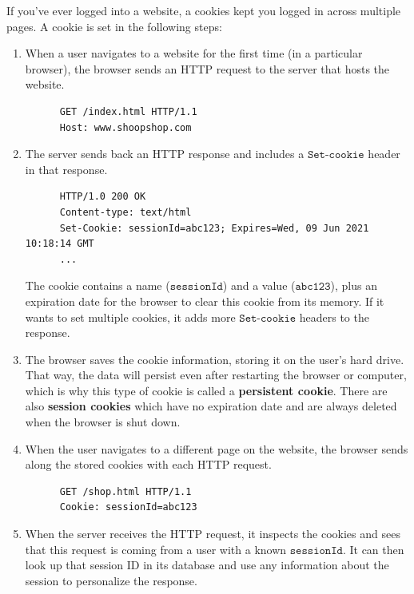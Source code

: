 \documentclass{article}
\begin{document}
  If you've ever logged into a website, a cookies kept you logged in across multiple pages. A cookie is set in the following steps: 
  \begin{enumerate}
      \item When a user navigates to a website for the first time (in a particular browser), the browser sends an HTTP request to the server that hosts the website. 
      \begin{lstlisting}
      GET /index.html HTTP/1.1
      Host: www.shoopshop.com
      \end{lstlisting}
      \item The server sends back an HTTP response and includes a $\texttt{Set-cookie}$ header in that response. 
      \begin{lstlisting}
      HTTP/1.0 200 OK
      Content-type: text/html
      Set-Cookie: sessionId=abc123; Expires=Wed, 09 Jun 2021 10:18:14 GMT
      ...
      \end{lstlisting}
      The cookie contains a name ($\texttt{sessionId}$) and a value ($\texttt{abc123}$), plus an expiration date for the browser to clear this cookie from its memory. If it wants to set multiple cookies, it adds more $\texttt{Set-cookie}$ headers to the response. 
      \item The browser saves the cookie information, storing it on the user's hard drive. That way, the data will persist even after restarting the browser or computer, which is why this type of cookie is called a \textbf{persistent cookie}. There are also \textbf{session cookies} which have no expiration date and are always deleted when the browser is shut down. 
      \item When the user navigates to a different page on the website, the browser sends along the stored cookies with each HTTP request. 
      \begin{lstlisting}
      GET /shop.html HTTP/1.1
      Cookie: sessionId=abc123
      \end{lstlisting}
      \item When the server receives the HTTP request, it inspects the cookies and sees that this request is coming from a user with a known $\texttt{sessionId}$. It can then look up that session ID in its database and use any information about the session to personalize the response. 
  \end{enumerate}
\end{document}

